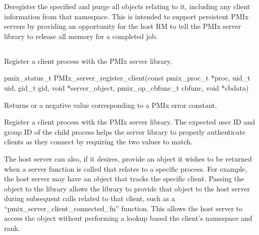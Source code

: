 \descr

Deregister the specified  and purge all objects relating to it, including any client information from that namespace.
This is intended to support persistent PMIx servers by providing an opportunity for the host \ac{RM} to tell the PMIx server library to release all memory for a completed job.



\subsection{}

\summary

Register a client process with the PMIx server library.

\format

\cspecificstart
\begin{codepar}
pmix_status_t PMIx_server_register_client(const pmix_proc_t *proc,
                                          uid_t uid, gid_t gid,
                                          void *server_object,
                                          pmix_op_cbfunc_t cbfunc, void *cbdata)
\end{codepar}
\cspecificend

\begin{arglist}
\end{arglist}

Returns  or a negative value corresponding to a PMIx error constant.

\descr

Register a client process with the PMIx server library.
The expected user ID and group ID of the child process helps the server library to properly authenticate clients as they connect by requiring the two values to match.

The host server can also, if it desires, provide an object it wishes to be returned when a server function is called that relates to a specific process.
For example, the host server may have an object that tracks the specific client.
Passing the object to the library allows the library to provide that object to the host server during subsequent calls related to that client, such as a ``pmix_server_client_connected_fn'' function.  This allows the host server to access the object without performing a lookup based the client's namespace and rank.



